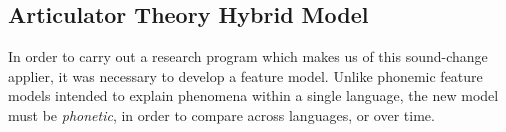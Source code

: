 \documentclass[10pt,letterpaper]{article}
\begin{document}
% 
% 
% 

\subsection{Articulator Theory Hybrid Model}
\label{sub:ATHM}
In order to carry out a research program which makes us of this sound-change applier, it was necessary to develop a feature model. Unlike phonemic feature models intended to explain phenomena within a single language, the new model must be \emph{phonetic}, in order to compare across languages, or over time.
\end{document}
